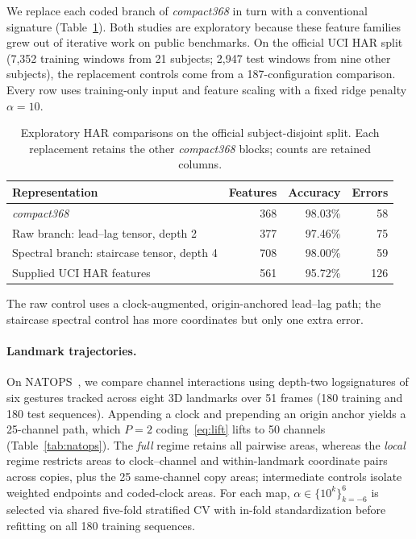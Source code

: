 \documentclass[a4paper]{esannV2}
\begin{document}
We replace each coded branch of \emph{compact368} in turn with a conventional
signature (Table~\ref{tab:har}). Both studies are exploratory because these
feature families grew out of iterative work on public benchmarks. On the official UCI
HAR split (7,352 training windows from 21 subjects; 2,947 test windows from
nine other subjects), the replacement controls come from a 187-configuration
comparison. Every row uses training-only input and feature scaling with a fixed
ridge penalty $\alpha=10$.


\begin{table}[!ht]
\centering
\begin{tabular}{@{}lrrr@{}}
\toprule
Representation & Features & Accuracy & Errors\\
\midrule
\emph{compact368} &368&98.03\%&58\\
Raw branch: lead--lag tensor, depth 2 &377&97.46\%&75\\
Spectral branch: staircase tensor, depth 4 &708&98.00\%&59\\
Supplied UCI HAR features &561&95.72\%&126\\
\bottomrule
\end{tabular}
\caption{Exploratory HAR comparisons on the official subject-disjoint split.
Each replacement retains the other \emph{compact368} blocks; counts are retained
columns.}
\label{tab:har}
\end{table}

The raw control uses a clock-augmented, origin-anchored lead--lag path;
the staircase spectral control has more coordinates but only one extra error.

\paragraph{Landmark trajectories.}

On NATOPS~\cite{natopsoriginal,natops}, we compare channel interactions using depth-two
logsignatures of six gestures
tracked across eight 3D landmarks over 51 frames (180 training and 180 test
sequences). Appending a clock and prepending an origin anchor yields a
25-channel path, which $P=2$ coding~\eqref{eq:lift} lifts to 50 channels (Table~\ref{tab:natops}).
The \emph{full} regime retains all pairwise areas, whereas the \emph{local}
regime restricts areas to clock--channel and within-landmark coordinate pairs
across copies, plus the 25 same-channel copy areas; intermediate controls isolate
weighted endpoints and coded-clock areas. For each map, $\alpha\in\{10^k\}_{k=-6}^6$
is selected via shared five-fold stratified CV with in-fold standardization before
refitting on all 180 training sequences.
\end{document}
